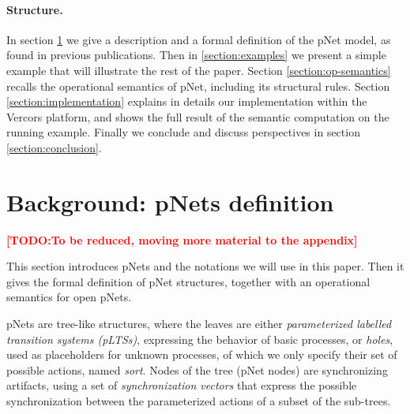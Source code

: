 \documentclass{lncs/llncs}
\newcommand{\TODO}[1]{\textcolor{red}{\textbf{[TODO:#1]}}}
\begin{document}
\paragraph{Structure.}
In section
\ref{section:pnets} we give a description and a formal definition of
the pNet model, as found in previous publications. Then in
\ref{section:examples} we present a simple example that will
illustrate the rest of the paper.
Section \ref{section:op-semantics} recalls the operational semantics
of pNet, including its structural rules.
Section \ref{section:implementation} explains in details our
implementation within the Vercors platform, and shows the full result of
the semantic computation on the running example.
Finally we conclude and discuss perspectives in section
\ref{section:conclusion}. 




\section{Background: pNets definition}
\label{section:pnets}

\TODO{To be reduced, moving more material to the appendix}
  
This section introduces pNets and the notations we will use in
this paper. Then it gives the formal definition of pNet structures,
together with an operational semantics for open pNets.

pNets are tree-like structures, where the leaves are either
\emph{parameterized labelled transition systems (pLTSs)}, expressing the
behavior of basic processes, or \emph{holes}, used as placeholders
for unknown processes, of which we only specify their set of possible
actions, named \emph{sort}.
Nodes of the tree (pNet nodes) are synchronizing artifacts, using a
set of \emph{synchronization vectors} that express the possible
synchronization between the parameterized actions of a subset of the
sub-trees.


\end{document}
